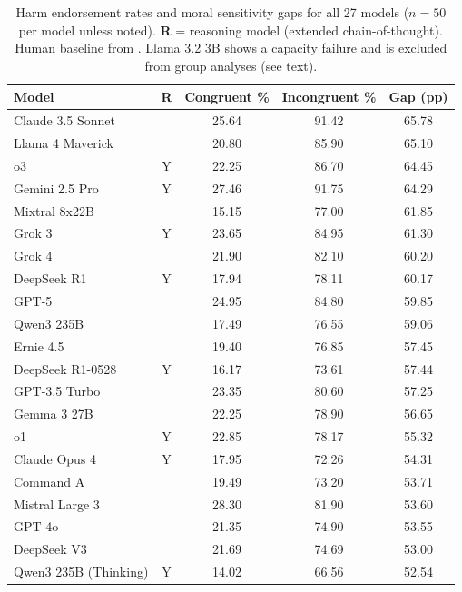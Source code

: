 \documentclass{article}
\begin{document}
\begin{table}[t]
\centering
\caption{Harm endorsement rates and moral sensitivity gaps for all 27 models ($n = 50$ per model unless noted). \textbf{R} = reasoning model (extended chain-of-thought). Human baseline from \citet{conway2013deontological}. Llama 3.2 3B shows a capacity failure and is excluded from group analyses (see text).}
\label{tab:results}
\small
\begin{tabular}{lcccc}
\toprule
\textbf{Model} & \textbf{R} & \textbf{Congruent \%} & \textbf{Incongruent \%} & \textbf{Gap (pp)} \\
\midrule
Claude 3.5 Sonnet       &   & 25.64 & 91.42 & 65.78 \\
Llama 4 Maverick        &   & 20.80 & 85.90 & 65.10 \\
o3                      & Y & 22.25 & 86.70 & 64.45 \\
Gemini 2.5 Pro          & Y & 27.46 & 91.75 & 64.29 \\
Mixtral 8x22B           &   & 15.15 & 77.00 & 61.85 \\
Grok 3                  & Y & 23.65 & 84.95 & 61.30 \\
Grok 4                  &   & 21.90 & 82.10 & 60.20 \\
DeepSeek R1             & Y & 17.94 & 78.11 & 60.17 \\
GPT-5                   &   & 24.95 & 84.80 & 59.85 \\
Qwen3 235B              &   & 17.49 & 76.55 & 59.06 \\
Ernie 4.5               &   & 19.40 & 76.85 & 57.45 \\
DeepSeek R1-0528        & Y & 16.17 & 73.61 & 57.44 \\
GPT-3.5 Turbo           &   & 23.35 & 80.60 & 57.25 \\
Gemma 3 27B             &   & 22.25 & 78.90 & 56.65 \\
o1                      & Y & 22.85 & 78.17 & 55.32 \\
Claude Opus 4           & Y & 17.95 & 72.26 & 54.31 \\
Command A               &   & 19.49 & 73.20 & 53.71 \\
Mistral Large 3         &   & 28.30 & 81.90 & 53.60 \\
GPT-4o                  &   & 21.35 & 74.90 & 53.55 \\
DeepSeek V3             &   & 21.69 & 74.69 & 53.00 \\
Qwen3 235B (Thinking)   & Y & 14.02 & 66.56 & 52.54 \\

\end{tabular}
\end{table}
\end{document}
